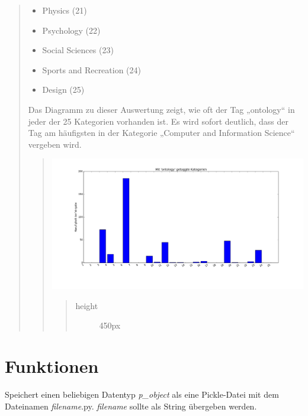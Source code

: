 \documentclass[letterpaper,10pt,english]{sphinxmanual}
\begin{document}
\begin{quote}
\begin{itemize}
\item {} 
Physics (21)

\item {} 
Psychology (22)

\item {} 
Social Sciences (23)

\item {} 
Sports and Recreation (24)

\item {} 
Design (25)

\end{itemize}

Das Diagramm zu dieser Auswertung zeigt, wie oft der Tag „ontology“ in jeder der 25 Kategorien vorhanden ist. Es wird sofort deutlich, dass der Tag am häufigsten in der Kategorie „Computer and Information Science“ vergeben wird.
\begin{quote}

\includegraphics{ontology.png}
\begin{quote}\begin{description}
\item[{height}] \leavevmode
450px

\end{description}\end{quote}
\end{quote}
\end{quote}


\section{Funktionen}
\label{project_3:funktionen}

\begin{fulllineitems}
\label{project_3:project_3.save_as_pickle}
Speichert einen beliebigen Datentyp \emph{p\_object} als eine Pickle-Datei mit dem Dateinamen \emph{filename}.py. \emph{filename} sollte als String übergeben werden.

\end{fulllineitems}
\end{document}

